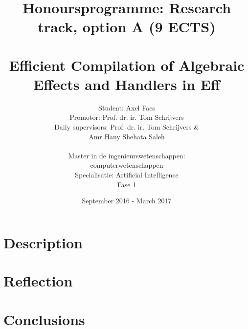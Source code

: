 \documentclass[notitlepage]{article}
\title{\vspace{-2cm}Honoursprogramme: Research track, option A (9 ECTS) \\\mbox{}\\ {Efficient Compilation of Algebraic Effects and Handlers in Eff}}
\author{Student: Axel Faes\\{ Promotor: Prof. dr. ir. Tom Schrijvers}\\{Daily supervisors:  Prof. dr. ir. Tom Schrijvers \&\\ Amr Hany Shehata Saleh}\\\mbox{}\\{Master in de ingenieurswetenschappen: \\computerwetenschappen}\\{Specialisatie: Artificial Intelligence}\\{Fase 1}}
\date{September 2016 - March 2017}
\begin{document}
\maketitle

\tableofcontents

\section{Description}


\section{Reflection}


\section{Conclusions}


\appendix



\printbibliography
\end{document}
